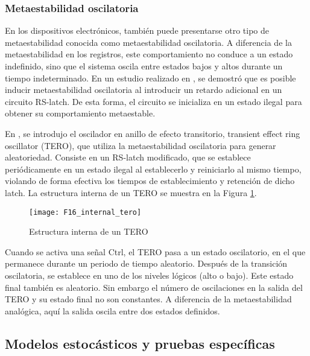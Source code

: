             \subsubsection{Metaestabilidad oscilatoria}

                  En los dispositivos electrónicos, también puede presentarse otro tipo de metaestabilidad conocida como metaestabilidad oscilatoria. A diferencia de la metaestabilidad en los registros, este comportamiento no conduce a un estado indefinido, sino que el sistema oscila entre estados bajos y altos durante un tiempo indeterminado. En un estudio realizado en \cite{Reyneri1990}, se demostró que es posible inducir metaestabilidad oscilatoria al introducir un retardo adicional en un circuito RS-latch. De esta forma, el circuito se inicializa en un estado ilegal para obtener su comportamiento metaestable.
                        
                En \cite{Varchola2010}, se introdujo el oscilador en anillo de efecto transitorio, transient effect ring oscillator (TERO), que utiliza la metaestabilidad oscilatoria para generar aleatoriedad. Consiste en un RS-latch modificado, que se establece periódicamente en un estado ilegal al establecerlo y reiniciarlo al mismo tiempo, violando de forma efectiva los tiempos de establecimiento y retención de dicho latch. La estructura interna de un TERO se muestra en la Figura \ref{fig:F16_internal_tero}.

                \begin{figure}[hbtp]
                    \caption{Estructura interna de un TERO}
                    \centering
                    \texttt{[image: F16\_internal\_tero]}
                    \label{fig:F16_internal_tero}
                \end{figure}

                Cuando se activa una señal Ctrl, el TERO pasa a un estado oscilatorio, en el que permanece durante un periodo de tiempo aleatorio. Después de la transición oscilatoria, se establece en uno de los niveles lógicos (alto o bajo). Este estado final también es aleatorio. Sin embargo el número de oscilaciones en la salida del TERO y su estado final no son constantes. A diferencia de la metaestabilidad analógica, aquí la salida oscila entre dos estados definidos.

        \subsection{Modelos estocásticos y pruebas específicas}

